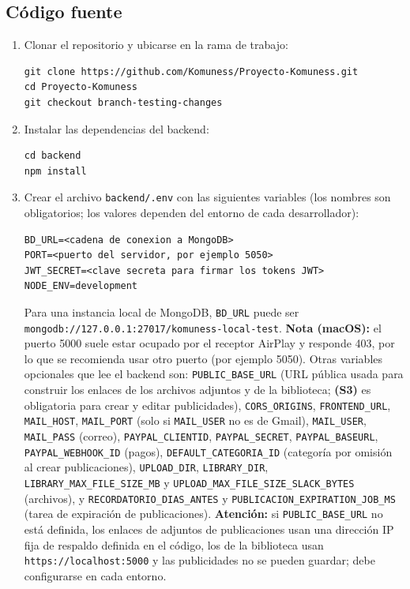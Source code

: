 \subsection{Código fuente}
\begin{enumerate}
    \item Clonar el repositorio y ubicarse en la rama de trabajo:
\begin{verbatim}
git clone https://github.com/Komuness/Proyecto-Komuness.git
cd Proyecto-Komuness
git checkout branch-testing-changes
\end{verbatim}
    \item Instalar las dependencias del backend:
\begin{verbatim}
cd backend
npm install
\end{verbatim}
    \item Crear el archivo \texttt{backend/.env} con las siguientes variables (los nombres son obligatorios; los valores dependen del entorno de cada desarrollador):
\begin{verbatim}
BD_URL=<cadena de conexion a MongoDB>
PORT=<puerto del servidor, por ejemplo 5050>
JWT_SECRET=<clave secreta para firmar los tokens JWT>
NODE_ENV=development
\end{verbatim}
    Para una instancia local de MongoDB, \texttt{BD\_URL} puede ser \texttt{mongodb://127.0.0.1:27017/komuness-local-test}. \textbf{Nota (macOS):} el puerto 5000 suele estar ocupado por el receptor AirPlay y responde 403, por lo que se recomienda usar otro puerto (por ejemplo 5050). Otras variables opcionales que lee el backend son: \texttt{PUBLIC\_BASE\_URL} (URL pública usada para construir los enlaces de los archivos adjuntos y de la biblioteca; \textbf{(S3)} es obligatoria para crear y editar publicidades), \texttt{CORS\_ORIGINS}, \texttt{FRONTEND\_URL}, \texttt{MAIL\_HOST}, \texttt{MAIL\_PORT} (solo si \texttt{MAIL\_USER} no es de Gmail), \texttt{MAIL\_USER}, \texttt{MAIL\_PASS} (correo), \texttt{PAYPAL\_CLIENTID}, \texttt{PAYPAL\_SECRET}, \texttt{PAYPAL\_BASEURL}, \texttt{PAYPAL\_WEBHOOK\_ID} (pagos), \texttt{DEFAULT\_CATEGORIA\_ID} (categoría por omisión al crear publicaciones), \texttt{UPLOAD\_DIR}, \texttt{LIBRARY\_DIR}, \texttt{LIBRARY\_MAX\_FILE\_SIZE\_MB} y \texttt{UPLOAD\_MAX\_FILE\_SIZE\_SLACK\_BYTES} (archivos), y \texttt{RECORDATORIO\_DIAS\_ANTES} y \texttt{PUBLICACION\_EXPIRATION\_JOB\_MS} (tarea de expiración de publicaciones). \textbf{Atención:} si \texttt{PUBLIC\_BASE\_URL} no está definida, los enlaces de adjuntos de publicaciones usan una dirección IP fija de respaldo definida en el código, los de la biblioteca usan \texttt{https://localhost:5000} y las publicidades no se pueden guardar; debe configurarse en cada entorno.

\end{enumerate}
